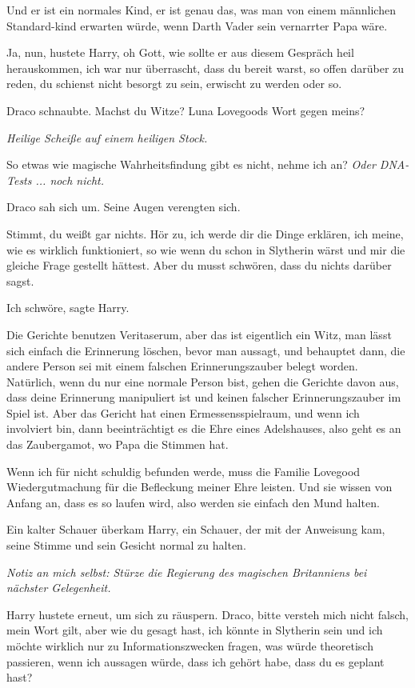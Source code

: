 Und er ist ein normales Kind, er ist genau das, was man von einem männlichen
Standard-kind erwarten würde, wenn Darth Vader sein vernarrter Papa wäre.

\glqq{}Ja, nun\grqq{}, hustete Harry, oh Gott, wie sollte er aus diesem Gespräch
heil herauskommen, \glqq{}ich war nur überrascht, dass du bereit warst, so offen
darüber zu reden, du schienst nicht besorgt zu sein, erwischt zu werden oder
so.\grqq{}

Draco schnaubte. \glqq{}Machst du Witze? Luna Lovegoods Wort gegen meins?\grqq{}

\emph{Heilige Scheiße auf einem heiligen Stock.}

\glqq{}So etwas wie magische Wahrheitsfindung gibt es nicht, nehme ich
an?\grqq{}
\emph{Oder DNA-Tests ... noch nicht.}

Draco sah sich um. Seine Augen verengten sich.

\glqq{}Stimmt, du weißt gar nichts. Hör zu, ich werde dir die Dinge erklären,
ich meine, wie es wirklich funktioniert, so wie wenn du schon in Slytherin wärst
und mir die gleiche Frage gestellt hättest. Aber du musst schwören, dass du
nichts darüber sagst.\grqq{}

\glqq{}Ich schwöre\grqq{}, sagte Harry.

\glqq{}Die Gerichte benutzen Veritaserum, aber das ist eigentlich ein Witz, man
lässt sich einfach die Erinnerung löschen, bevor man aussagt, und behauptet
dann, die andere Person sei mit einem falschen Erinnerungszauber belegt worden.
Natürlich, wenn du nur eine normale Person bist, gehen die Gerichte davon aus,
dass deine Erinnerung manipuliert ist und keinen falscher Erinnerungszauber im
Spiel ist. Aber das Gericht hat einen Ermessensspielraum, und wenn ich
involviert bin, dann beeinträchtigt es die Ehre eines Adelshauses, also geht es
an das Zaubergamot, wo Papa die Stimmen hat.

Wenn ich für nicht schuldig befunden werde, muss die Familie Lovegood
Wiedergutmachung für die Befleckung meiner Ehre leisten. Und sie wissen von
Anfang an, dass es so laufen wird, also werden sie einfach den Mund
halten.\grqq{}

Ein kalter Schauer überkam Harry, ein Schauer, der mit der Anweisung kam, seine
Stimme und sein Gesicht normal zu halten.

\emph{Notiz an mich selbst: Stürze die Regierung des magischen Britanniens bei
nächster Gelegenheit.}

Harry hustete erneut, um sich zu räuspern. \glqq{}Draco, bitte versteh mich
nicht falsch, mein Wort gilt, aber wie du gesagt hast, ich könnte in Slytherin
sein und ich möchte wirklich nur zu Informationszwecken fragen, was würde
theoretisch passieren, wenn ich aussagen würde, dass ich gehört habe, dass du es
geplant hast?\grqq{}

